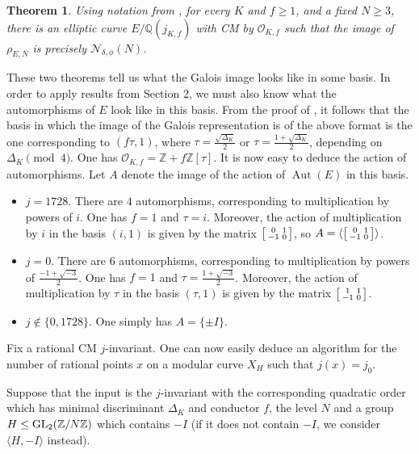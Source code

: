 \documentclass[10pt,leqno]{amsart}
\newcommand\sm[1]{\begin{bsmallmatrix}#1\end{bsmallmatrix}}
\newcommand{\Z}{\mathbb{Z}}
\newcommand{\Q}{\mathbb{Q}}
\newcommand{\GL}{\textnormal{GL}}
\DeclareMathOperator{\Aut}{Aut}
\newtheorem{theorem}{Theorem}[]
\theoremstyle{definition}
\theoremstyle{remark}
\numberwithin{theorem}{section}
\begin{document}
\begin{theorem}\cite[Theorem 1.2.(1)]{alvarocm} \label{alvaro2}
    Using notation from , for every $K$ and $f\geq 1$, and a fixed $N\geq 3$, there is an elliptic curve $E/\Q(j_{K,f})$ with CM by $\mathcal O_{K,f}$ such that the image of $\rho_{E,N}$ is precisely $\mathcal N_{\delta,\phi}(N)$.
\end{theorem}

These two theorems tell us what the Galois image looks like in some basis. In order to apply results from Section 2, we must also know what the automorphisms of $E$ look like in this basis. From the proof of \cite[Theorem 1.1]{alvarocm}, it follows that the basis in which the image of the Galois representation is of the above format is the one corresponding to $(f\tau, 1)$, where $\tau=\frac{\sqrt{\Delta_K}}{2}$ or $\tau=\frac{1+\sqrt{\Delta_K}}{2}$, depending on $\Delta_K \pmod 4$. One has $\mathcal{O}_{K,f}=\Z+f\Z[\tau]$. It is now easy to deduce the action of automorphisms. Let $A$ denote the image of the action of $\Aut(E)$ in this basis.

\begin{itemize}
    \item $j=1728$. There are $4$ automorphisms, corresponding to multiplication by powers of $i$. One has $f=1$ and $\tau=i$. Moreover, the action of multiplication by $i$ in the basis $(i, 1)$ is given by the matrix $\sm{0 & 1 \\-1 & 0}$, so $A=\langle \sm{0 & 1 \\-1 & 0} \rangle $. 
    \item $j=0$. There are $6$ automorphisms, corresponding to multiplication by powers of $\frac{-1+\sqrt{-3}}{2}$. One has $f=1$ and $\tau=\frac{1+\sqrt{-3}}{2}$. Moreover, the action of multiplication by $\tau$ in the basis $(\tau, 1)$ is given by the matrix $\sm{1 & 1\\ -1 & 0}$.
    \item $j\not \in \{0, 1728\}$. One simply has $A=\{\pm I\}$.
\end{itemize}

Fix a rational CM $j$-invariant. One can now easily deduce an algorithm for the number of rational points $x$ on a modular curve $X_H$ such that $j(x)=j_0$.

Suppose that the input is the $j$-invariant with the corresponding quadratic order which has minimal discriminant $\Delta_K$ and conductor $f$, the level $N$ and a group $H \leq \GL_2(\Z/N\Z)$ which contains $-I$ (if it does not contain $-I$, we consider $\langle H, -I\rangle$ instead).
\end{document}
